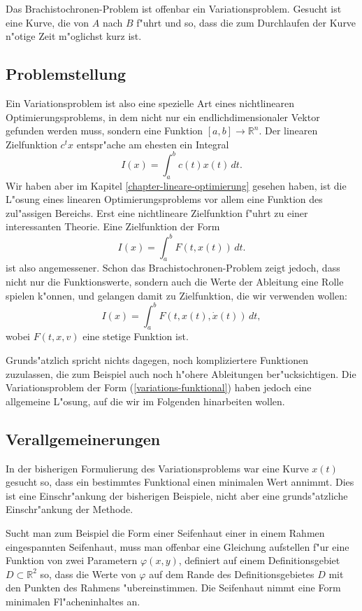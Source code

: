 Das Brachistochronen-Problem ist offenbar ein Variationsproblem.
Gesucht ist eine Kurve, die von $A$ nach $B$ f"uhrt und so, dass
die zum Durchlaufen der Kurve n"otige Zeit m"oglichst kurz ist.

\subsection{Problemstellung}
Ein Variationsproblem ist also eine spezielle Art eines nichtlinearen
Optimierungsproblems, in dem nicht nur ein endlichdimensionaler
Vektor gefunden werden muss, sondern eine Funktion $[a,b]\to \mathbb R^n$.
Der linearen Zielfunktion $c^tx$ entspr"ache am ehesten ein Integral
\[
I(x)=\int_a^b c(t) x(t)\,dt.
\]
Wir haben aber im Kapitel \ref{chapter-lineare-optimierung} gesehen haben,
ist die L"osung eines linearen Optimierungsproblems vor allem eine 
Funktion des zul"assigen Bereichs.
Erst eine nichtlineare Zielfunktion f"uhrt zu einer interessanten
Theorie. Eine Zielfunktion der Form
\[
I(x)=\int_a^b F(t, x(t))\,dt.
\]
ist also angemessener.
Schon das Brachistochronen-Problem zeigt
jedoch, dass nicht nur die Funktionswerte, sondern auch die Werte
der Ableitung eine Rolle spielen k"onnen, und gelangen damit
zu Zielfunktion, die wir verwenden wollen:
\begin{equation}
I(x)=\int_a^b F(t, x(t), \dot x(t))\,dt,
\label{variations-funktional}
\end{equation}
wobei $F(t,x,v)$ eine stetige Funktion ist.

Grunds"atzlich spricht nichts dagegen, noch kompliziertere
Funktionen zuzulassen, die zum Beispiel auch noch h"ohere
Ableitungen ber"ucksichtigen.
Die Variationsproblem der Form (\ref{variations-funktional}) 
haben jedoch eine allgemeine L"osung, auf die wir im Folgenden
hinarbeiten wollen.

\subsection{Verallgemeinerungen}
In der bisherigen Formulierung des Variationsproblems war eine
Kurve $x(t)$ gesucht so, dass ein bestimmtes Funktional einen
minimalen Wert annimmt. Dies ist eine Einschr"ankung der bisherigen
Beispiele, nicht aber eine grunds"atzliche Einschr"ankung der Methode.

Sucht man zum Beispiel die Form einer Seifenhaut einer in einem
Rahmen eingespannten Seifenhaut, muss man offenbar eine Gleichung
aufstellen f"ur eine Funktion von zwei Parametern $\varphi(x,y)$,
definiert auf einem Definitionsgebiet $D\subset \mathbb R^2$ so, dass
die Werte von $\varphi$ auf dem Rande des Definitionsgebietes $D$ mit
den Punkten des Rahmens "ubereinstimmen. Die Seifenhaut nimmt eine
Form minimalen Fl"acheninhaltes an.

